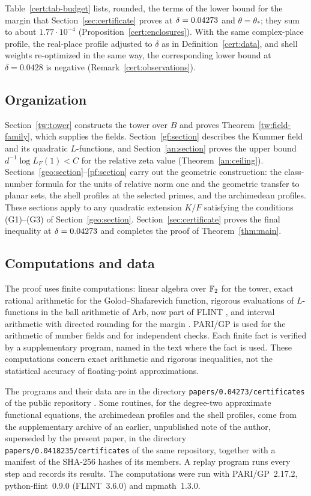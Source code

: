 Table~\ref{cert:tab-budget} lists, rounded, the terms of the lower bound
for the margin that Section~\ref{sec:certificate} proves at
$\delta=0.04273$ and $\theta=\theta_*$; they sum to about $1.77\cdot10^{-4}$
(Proposition~\ref{cert:enclosures}). With the same complex-place
profile, the real-place profile adjusted to $\delta$ as in
Definition~\ref{cert:data}, and shell weights re-optimized in the same
way, the corresponding lower bound at $\delta=0.0428$ is negative
(Remark~\ref{cert:observations}).

\subsection{Organization}\label{intro:organization}
Section~\ref{tw:tower} constructs the tower over $B$ and proves
Theorem~\ref{tw:field-family}, which supplies the fields.
Section~\ref{gf:section} describes the Kummer field and its quadratic
$L$-functions, and Section~\ref{an:section} proves the upper bound
$d^{-1}\log L_F(1)<C$ for the relative zeta value
(Theorem~\ref{an:ceiling}). Sections~\ref{geo:section}--\ref{pf:section}
carry out the geometric construction: the class-number formula for the
units of relative norm one and the geometric transfer to planar sets,
the shell profiles at the selected primes, and the archimedean profiles.
These sections apply to any quadratic extension $K/F$ satisfying the
conditions (G1)--(G3) of Section~\ref{geo:section}. Section~\ref{sec:certificate} proves the final inequality
at $\delta=0.04273$ and completes the proof of
Theorem~\ref{thm:main}.

\subsection{Computations and data}\label{intro:code}
The proof uses finite computations: linear algebra over $\mathbb F_2$ for the
tower, exact rational arithmetic for the Golod--Shafarevich function,
rigorous evaluations of $L$-functions in the ball arithmetic of Arb,
now part of FLINT \cite{Johansson2017,FLINT}, and interval arithmetic
with directed rounding for the margin \cite{Mpmath}. PARI/GP \cite{PARI} is
used for the arithmetic of number fields and for independent checks.
Each finite fact is verified by a supplementary program, named in the
text where the fact is used. These computations concern exact
arithmetic and rigorous inequalities, not the statistical accuracy of
floating-point approximations.

The programs and their data are in the directory
\texttt{papers/0.04273/certificates} of the public repository
\cite{NaslundCode2026}. Some routines, for the degree-two approximate
functional equations, the archimedean profiles and the shell profiles,
come from the supplementary archive of an earlier,
unpublished note of the author, superseded by the present paper, in the
directory
\texttt{papers/0.0418235/certificates} of the same repository, together
with a manifest of the SHA-256 hashes of its members. A replay program
runs every step and records its results. The computations were run with
PARI/GP~2.17.2, python-flint~0.9.0 (FLINT~3.6.0) and mpmath~1.3.0.

